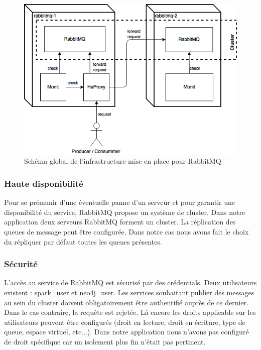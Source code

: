 \begin{figure}
    \centering
    \includegraphics[scale=0.5]{pics/rabbitmq-infra.png}
    \caption{Schéma global de l'infrastructure mise en place pour RabbitMQ}
\end{figure}
\FloatBarrier
\subsubsection{Haute disponibilité}

Pour se prémunir d'une éventuelle panne d'un serveur et pour garantir une disponibilité du service, RabbitMQ propose un système de cluster. Dans notre application deux serveurs RabbitMQ forment un cluster. La réplication des queues de message peut être configurée. Dans notre cas nous avons fait le choix du répliquer par défaut toutes les queues présentes.

\subsubsection{Sécurité}

L'accès au service de RabbitMQ est sécurisé par des crédentials. Deux utilisateurs existent : spark\_user et neo4j\_user. Les services souhaitant publier des messages au sein du cluster doivent obligatoirement être authentifié auprès de ce dernier. Dans le cas contraire, la requête est rejetée. Là encore les droits applicable sur les utilisateurs peuvent être configurés (droit en lecture, droit en écriture, type de queue, espace virtuel, etc...). Dans notre application nous n'avons pas configuré de droit spécifique car un isolement plus fin n'était pas pertinent.

